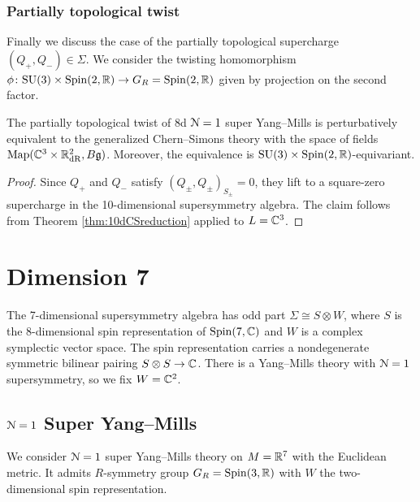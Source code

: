 \documentclass[10pt, oneside]{article}
\begin{document}
\subsubsection{Partially topological twist}
\label{sect:8dpartiallytopologicaltwist}

Finally we discuss the case of the partially topological supercharge $(Q_+, Q_-)\in\Sigma$. We consider the twisting homomorphism $\phi\colon \mathrm{SU}(3)\times \mathrm{Spin}(2, \mathbb R)\rightarrow G_R=\mathrm{Spin}(2, \mathbb R)$ given by projection on the second factor.

\begin{theorem}
The partially topological twist of 8d $\mathcal N=1$ super Yang--Mills is perturbatively equivalent to the generalized Chern--Simons theory with the space of fields $\operatorname{Map}(\mathbb C^3\times \mathbb R^2_{\mathrm{dR}}, B\mathfrak g)$. Moreover, the equivalence is $\mathrm{SU}(3)\times \mathrm{Spin}(2, \mathbb R)$-equivariant.
\label{thm:8dpartiallytopologicaltwist}
\end{theorem}
\begin{proof}
Since $Q_+$ and $Q_-$ satisfy $(Q_\pm, Q_\pm)_{S_\pm} = 0$, they lift to a square-zero supercharge in the 10-dimensional supersymmetry algebra. The claim follows from Theorem \ref{thm:10dCSreduction} applied to $L=\mathbb C^3$.
\end{proof}

\section{Dimension 7} \label{7d_section}

The 7-dimensional supersymmetry algebra has odd part $\Sigma\cong S\otimes W$, where $S$ is the 8-dimensional spin representation of $\mathrm{Spin}(7, \mathbb C)$ and $W$ is a complex symplectic vector space.  The spin representation carries a nondegenerate symmetric bilinear pairing $S\otimes S\rightarrow \mathbb C$. There is a Yang--Mills theory with $\mathcal{N}=1$ supersymmetry, so we fix $W = \mathbb C^2$.

\subsection{\texorpdfstring{$\mathcal N=1$}{N=1} Super Yang--Mills}

We consider $\mathcal N=1$ super Yang--Mills theory on $M=\mathbb R^7$ with the Euclidean metric. It admits $R$-symmetry group $G_R=\mathrm{Spin}(3, \mathbb R)$ with $W$ the two-dimensional spin representation.
\end{document}
